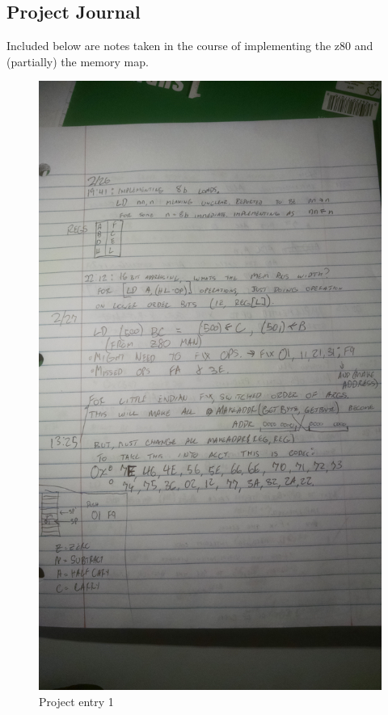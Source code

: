 \documentclass{article}
\begin{document}
    \subsection{Project Journal}
    Included below are notes taken in the course of implementing the z80 and (partially) the memory map.
    \begin{figure}[h]
        \centering
        \includegraphics[width=12cm, keepaspectratio]{entry_1}
        \caption{Project entry 1}
    \end{figure}
\end{document}
